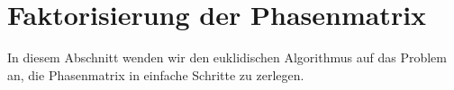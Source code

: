 %
%
\section{Faktorisierung der Phasenmatrix}
In diesem Abschnitt wenden wir den euklidischen Algorithmus auf das
Problem an, die Phasenmatrix in einfache Schritte zu zerlegen.

